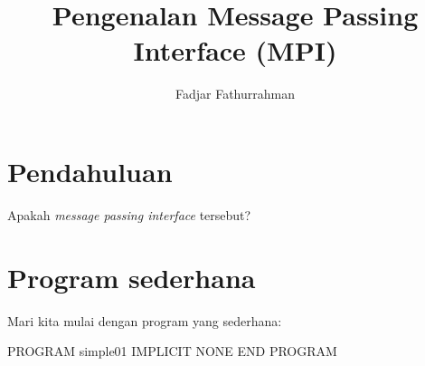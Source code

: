 \documentclass[bahasa,a4paper,12pt]{extarticle}
\begin{document}
\title{Pengenalan Message Passing Interface (MPI)}
\author{Fadjar Fathurrahman}
\maketitle

\section{Pendahuluan}

Apakah \textit{message passing interface} tersebut?


\section{Program sederhana}

Mari kita mulai dengan program yang sederhana:
\begin{fortrancode}
PROGRAM simple01
  IMPLICIT NONE
END PROGRAM
\end{fortrancode}
\end{document}
